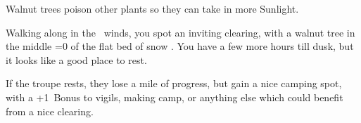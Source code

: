 Walnut trees poison other plants so they can take in more Sunlight.

\begin{boxtext}
  Walking along in the \showTemperature\ winds, you spot an inviting clearing, with a walnut tree in the middle%
  \ifnum\value{temperature}=0%
    \space of the flat bed of snow%
  \fi.
  You have a few more hours till dusk, but it looks like a good place to rest.
\end{boxtext}

If the troupe rests, they lose a mile of progress, but gain a nice camping spot, with a +1~Bonus to \glspl{vigil}, making camp, or anything else which could benefit from a nice clearing.
